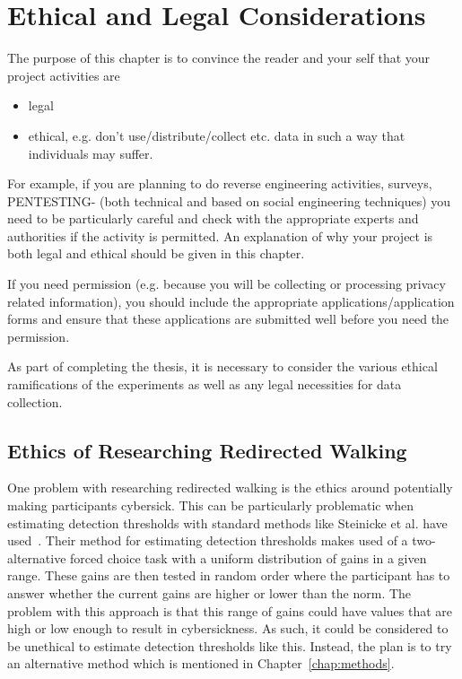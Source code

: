 \chapter{Ethical and Legal Considerations} \label{chap:ethics}

The purpose of this chapter is to convince the
reader and your self that your project activities are
\begin{itemize}
\item legal
\item ethical, e.g. don't use/distribute/collect etc. data in such a way that individuals may suffer.
\end{itemize}
For example, if you are planning to do reverse engineering activities, surveys, PENTESTING- (both technical and based on social engineering techniques) you need to be particularly careful and check with the appropriate experts and authorities if the activity is permitted.  An explanation of why your project is both legal and ethical should be given in this chapter.

If you need permission (e.g. because you will be collecting or processing privacy related information), 
you should  include the appropriate applications/application forms and ensure that these applications 
are submitted well before you need the permission.
\fi

As part of completing the thesis, it is necessary to consider the various ethical ramifications of the experiments as well as any legal necessities for data collection.

\section{Ethics of Researching Redirected Walking}
One problem with researching redirected walking is the ethics around potentially making participants cybersick. This can be particularly problematic when estimating detection thresholds with standard methods like Steinicke et al. have used~\cite{5072212}. Their method for estimating detection thresholds makes used of a two-alternative forced choice task with a uniform distribution of gains in a given range. These gains are then tested in random order where the participant has to answer whether the current gains are higher or lower than the norm. The problem with this approach is that this range of gains could have values that are high or low enough to result in cybersickness. As such, it could be considered to be unethical to estimate detection thresholds like this. Instead, the plan is to try an alternative method which is mentioned in Chapter~\ref{chap:methods}. 

